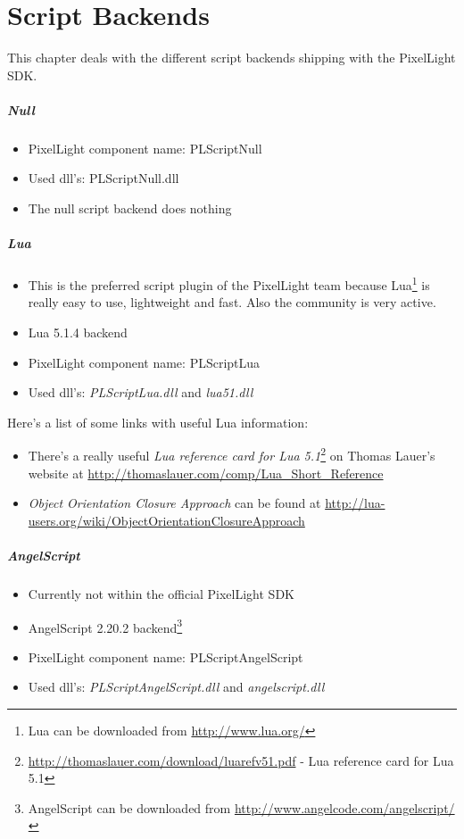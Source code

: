\chapter{Script Backends}
This chapter deals with the different script backends shipping with the PixelLight SDK.


\paragraph{Null}
\begin{itemize}
\item PixelLight component name: PLScriptNull
\item Used dll's: PLScriptNull.dll
\item The null script backend does nothing
\end{itemize}


\paragraph{Lua}
\begin{itemize}
\item This is the preferred script plugin of the PixelLight team because Lua\footnote{Lua can be downloaded from \url{http://www.lua.org/}} is really easy to use, lightweight and fast. Also the community is very active.
\item Lua 5.1.4 backend
\item PixelLight component name: PLScriptLua
\item Used dll's: \emph{PLScriptLua.dll} and \emph{lua51.dll}
\end{itemize}

Here's a list of some links with useful Lua information:
\begin{itemize}
\item There's a really useful \emph{Lua reference card for Lua 5.1}\footnote{\url{http://thomaslauer.com/download/luarefv51.pdf} - Lua reference card for Lua 5.1} on Thomas Lauer's website at \url{http://thomaslauer.com/comp/Lua_Short_Reference}
\item \emph{Object Orientation Closure Approach} can be found at \url{http://lua-users.org/wiki/ObjectOrientationClosureApproach}
\end{itemize}


\paragraph{AngelScript}
\begin{itemize}
\item Currently not within the official PixelLight SDK
\item AngelScript 2.20.2 backend\footnote{AngelScript can be downloaded from \url{http://www.angelcode.com/angelscript/}}
\item PixelLight component name: PLScriptAngelScript
\item Used dll's: \emph{PLScriptAngelScript.dll} and \emph{angelscript.dll}
\end{itemize}

